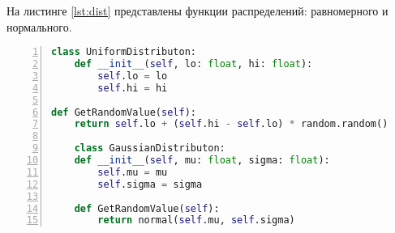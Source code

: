 На листинге \ref{lst:dist} представлены функции распределений: равномерного и нормального.

\newpage
\begin{lstlisting}[language=Python,
    frame= tb,
    numbers=left,
    numberstyle=\footnotesize,
    caption={Функции распределений},
    label={lst:dist}]
class UniformDistributon:
    def __init__(self, lo: float, hi: float):
        self.lo = lo
        self.hi = hi
    
def GetRandomValue(self):
    return self.lo + (self.hi - self.lo) * random.random()

    class GaussianDistributon:
    def __init__(self, mu: float, sigma: float):
        self.mu = mu
        self.sigma = sigma
    
    def GetRandomValue(self):
        return normal(self.mu, self.sigma)
\end{lstlisting}